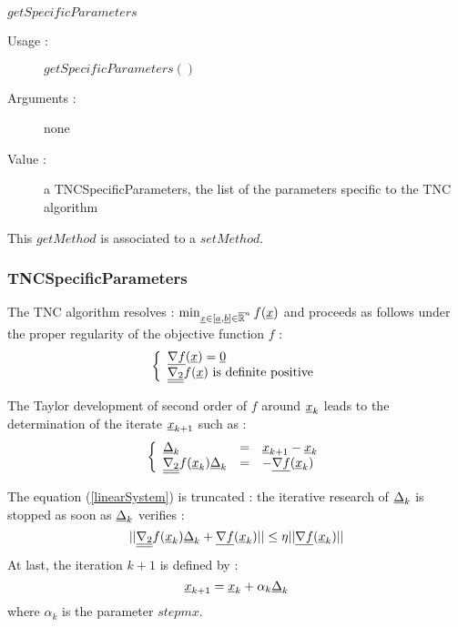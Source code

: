 \begin{description}
\begin{description}
  \item $getSpecificParameters$
    \begin{description}
    \item[Usage :] $getSpecificParameters()$
    \item[Arguments :] none
    \item[Value :]  a TNCSpecificParameters, the list of the parameters specific to the TNC algorithm
    \end{description}
  \end{description}

  This  $getMethod$  is associated to a $setMethod$.

\end{description}





\newpage                 \subsubsection{TNCSpecificParameters}

The TNC algorithm resolves : $\min_{{\underline{x}} \in [{\underline{a}},{\underline{b}}] \in \overline{\mathbb{R}}^n} f({\underline{x}})$ and proceeds as follows under the proper regularity of the objective function $f$ :
$$
\left\{
  \begin{array}{l}
    {\underline{\nabla f}}({\underline{x}}) ={\underline{0}}  \\
    {\underline{\underline{\nabla_2}}} f({\underline{x}}) \mbox{ is definite positive}
  \end{array}
\right.
$$

The Taylor development of second order of $f$ around  ${\underline{x}}_k$ leads to the determination of the iterate ${\underline{x}}_{k+1}$ such as :
\begin{equation}\label{linearSystem}
  \left\{
    \begin{array}{lcl}
      {\underline{\Delta}}_k & = & {\underline{x}}_{k+1} - {\underline{x}}_k  \\
      {\underline{\underline{\nabla_2}}} f({\underline{x}}_k){\underline{\Delta}}_k & = & -{\underline{\nabla f}}({\underline{x}}_k)
    \end{array}
  \right.
\end{equation}

The equation (\ref{linearSystem}) is truncated : the iterative research of ${\underline{\Delta}}_k$ is stopped as soon as ${\underline{\Delta}}_k$ verifies :
$$
|| {\underline{\underline{\nabla_2}}} f({\underline{x}}_k){\underline{\Delta}}_k + {\underline{\nabla f}}({\underline{x}}_k) || \leq \eta ||{\underline{\nabla f}}({\underline{x}}_k) ||
$$
At last, the iteration $k+1$ is defined by :
$$
{\underline{x}}_{k+1} = {\underline{x}}_k + \alpha_k {\underline{\Delta}}_k
$$
where $\alpha_k$ is the parameter $stepmx$.




